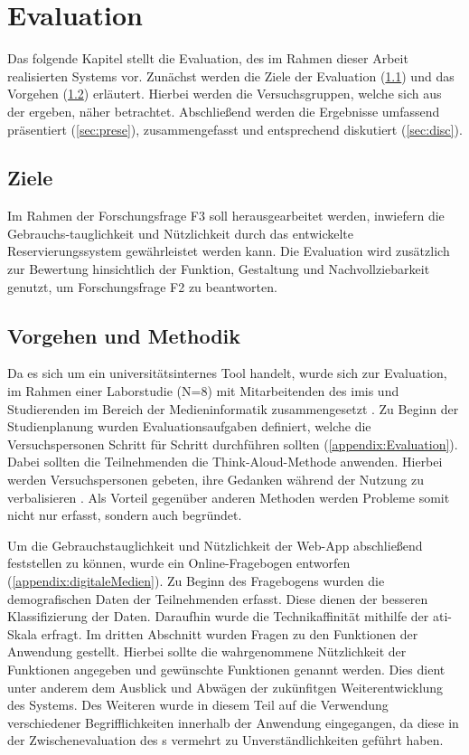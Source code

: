 

\chapter{Evaluation}
\label{chapter-evaluation}
Das folgende Kapitel stellt die Evaluation, des im Rahmen dieser Arbeit realisierten Systems vor.
Zunächst werden die Ziele der Evaluation (\ref{sec:zieleev}) und das Vorgehen (\ref{sec:vorgeen})
erläutert. Hierbei werden die Versuchsgruppen, welche sich aus der 
ergeben, näher betrachtet. Abschließend werden die Ergebnisse umfassend präsentiert (\ref{sec:prese}), zusammengefasst
und entsprechend diskutiert (\ref{sec:disc}).

\section{Ziele}
\label{sec:zieleev}
Im Rahmen der Forschungsfrage F3 soll herausgearbeitet werden, inwiefern die
Gebrauchs-tauglichkeit und Nützlichkeit durch das entwickelte Reservierungssystem
gewährleistet werden kann. Die Evaluation wird zusätzlich zur Bewertung
hinsichtlich der Funktion, Gestaltung und Nachvollziebarkeit genutzt, um
Forschungsfrage F2 zu beantworten.


\section{Vorgehen und Methodik}
\label{sec:vorgeen}
Da es sich um ein universitätsinternes Tool handelt, wurde sich zur Evaluation, im Rahmen einer
Laborstudie (N=8) mit Mitarbeitenden des \ac{imis} und Studierenden im Bereich der Medieninformatik
zusammengesetzt \cite{jandl_paper_2015}. Zu Beginn der Studienplanung wurden Evaluationsaufgaben
definiert, welche die Versuchspersonen Schritt für Schritt durchführen sollten
(\ref{appendix:Evaluation}). Dabei sollten die Teilnehmenden die Think-Aloud-Methode anwenden.
Hierbei werden Versuchspersonen gebeten, ihre Gedanken während der Nutzung zu verbalisieren
\cite{nielsen_usability_1994}. Als Vorteil gegenüber anderen Methoden werden Probleme somit nicht
nur erfasst, sondern auch begründet\cite{nielsen_think}.

Um die Gebrauchstauglichkeit und Nützlichkeit der Web-App abschließend feststellen zu können, wurde
ein Online-Fragebogen entworfen (\ref{appendix:digitaleMedien}). Zu Beginn des Fragebogens wurden
die demografischen Daten der Teilnehmenden erfasst. Diese dienen der besseren Klassifizierung der
Daten. Daraufhin wurde die Technikaffinität mithilfe der \ac{ati}-Skala erfragt. Im dritten
Abschnitt wurden Fragen zu den Funktionen der Anwendung gestellt. Hierbei sollte die wahrgenommene
Nützlichkeit der Funktionen angegeben und gewünschte Funktionen genannt werden. Dies dient unter
anderem dem Ausblick und Abwägen der zukünfitgen Weiterentwicklung des Systems. Des Weiteren wurde
in diesem Teil auf die Verwendung verschiedener Begrifflichkeiten innerhalb der Anwendung
eingegangen, da diese in der Zwischenevaluation des s vermehrt zu
Unverständlichkeiten geführt haben.

